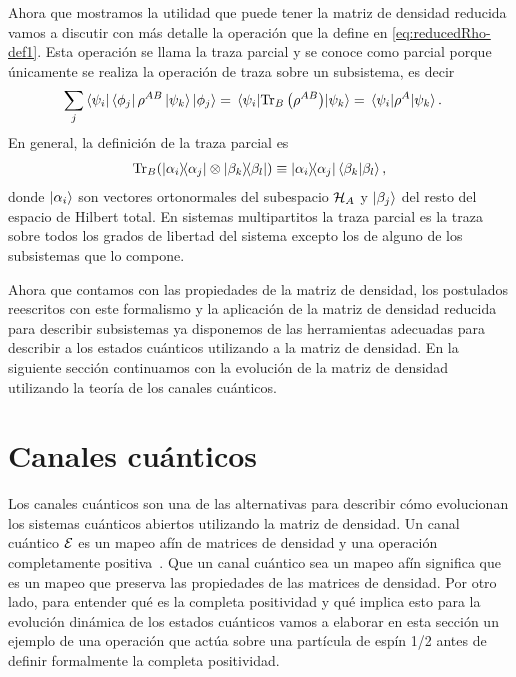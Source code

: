 Ahora que mostramos la utilidad que puede tener la matriz de densidad
reducida vamos a discutir con más detalle la operación que la define en
\eqref{eq:reducedRho-def1}. 
Esta operación se llama la traza parcial y se conoce como parcial 
porque únicamente se realiza la operación de traza sobre un subsistema, 
es decir
\begin{align} 
	\sum _j \bra{\psi_i}\bra{\phi_j}\rho^{AB}\ket{\psi_k}\ket{\phi_j}
	&=\matrixel{\psi_i}{\Tr_B\qty(\rho^{AB})}{\psi_k}
	= \matrixel{\psi_i}{\rho^A}{\psi_k}.
	\label{eq:partialTrace-def}
\end{align}
En general, la definición de la traza parcial es \cite{nielsen_chuang_2011}
\begin{align}
	\Tr_B (\dyad{\alpha_i}{\alpha_j}\otimes \dyad{\beta_k}{\beta_l})
	\equiv
	\dyad{\alpha_i}{\alpha_j}\braket{\beta_k}{\beta_l},
	\label{eq:part_trace-def}
\end{align}
donde $\ket{\alpha_i}$ son vectores ortonormales del subespacio $\mathcal{H}_A$
y $\ket{\beta_j}$ del resto del espacio de Hilbert total. En sistemas 
multipartitos la traza parcial es la traza sobre 
todos los grados de libertad del sistema excepto los de alguno de los 
subsistemas que lo compone.

Ahora que contamos con las propiedades de la matriz de densidad, 
los postulados reescritos con este formalismo y la aplicación de la matriz
de densidad reducida para describir subsistemas ya disponemos de
las herramientas adecuadas para describir a los estados cuánticos 
utilizando a la matriz de densidad. En la siguiente sección continuamos 
con la evolución de la matriz de densidad utilizando la teoría de los 
canales cuánticos.

\section{Canales cuánticos}\label{sec:qtm-channels} %

Los canales cuánticos son una de las alternativas para describir cómo
evolucionan los sistemas cuánticos abiertos utilizando la matriz de densidad. 
Un canal cuántico $\mathcal{E}$ es un mapeo afín de matrices de densidad y una
operación completamente positiva~\cite{bengtsson_zyczkowski_2017}.
Que un canal cuántico sea un mapeo afín significa que es un mapeo 
que preserva las propiedades de las matrices de densidad. Por otro lado,
para entender qué es la completa positividad y qué implica esto para la 
evolución dinámica de los estados cuánticos vamos a elaborar en 
esta sección un ejemplo de una operación que actúa sobre una partícula
de espín 1/2 antes de definir formalmente la completa positividad.

